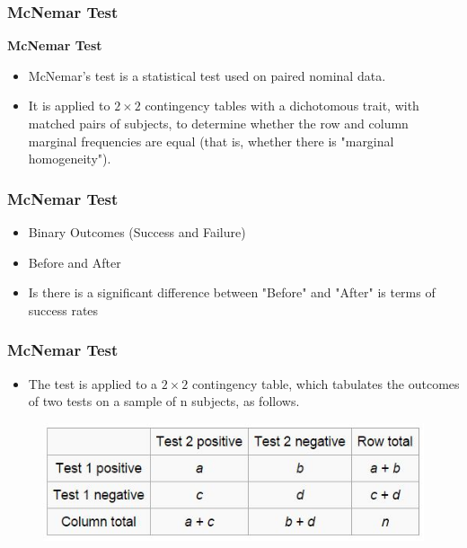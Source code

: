 \documentclass{beamer}
\begin{document}
\begin{frame}
\frametitle{McNemar Test}
\Large
\textbf{McNemar Test}
\begin{itemize}
\item McNemar's test is a statistical test used on paired nominal data. 
\item It is applied to $2 \times 2$ contingency tables with a dichotomous trait, with matched pairs of subjects, to 
determine whether the row and column marginal frequencies are equal (that is, whether there is "marginal homogeneity").
\end{itemize}

\end{frame}
\begin{frame}
\frametitle{McNemar Test}
\Large

\begin{itemize}
\item Binary Outcomes (Success and Failure)
\item Before and After 
\item Is there is a significant difference between "Before" and "After" is terms of success rates

\end{itemize}


\end{frame}
\begin{frame}
\frametitle{McNemar Test}
\Large
\begin{itemize}
\item The test is applied to a $2 \times 2$ contingency table, which tabulates the outcomes of two tests on a sample of n subjects, as follows.

\end{itemize}
\begin{figure}
\centering
\includegraphics[width=0.99\linewidth]{./mcmenar1}
\end{figure}



\end{frame}
\end{document}
